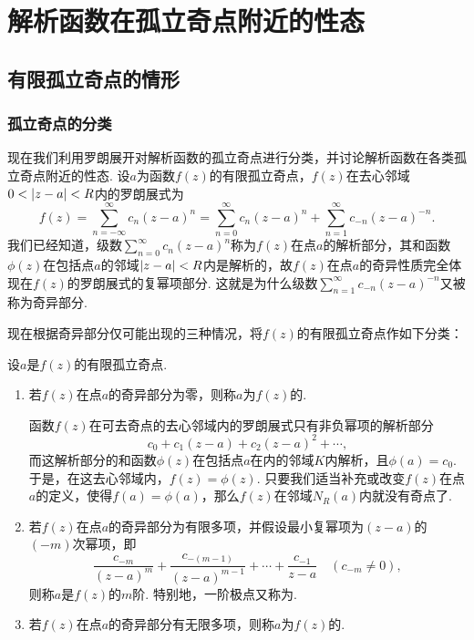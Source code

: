 \section{解析函数在孤立奇点附近的性态}
\subsection{有限孤立奇点的情形}
\subsubsection{孤立奇点的分类}
现在我们利用罗朗展开对解析函数的孤立奇点进行分类，并讨论解析函数在各类孤立奇点附近的性态.
设\(a\)为函数\(f(z)\)的有限孤立奇点，\(f(z)\)在去心邻域\(0<\abs{z-a}<R\)内的罗朗展式为\[
f(z) = \sum\limits_{n=-\infty}^\infty c_n (z-a)^n
= \sum\limits_{n=0}^\infty c_n (z-a)^n
+ \sum\limits_{n=1}^\infty c_{-n} (z-a)^{-n}.
\]我们已经知道，级数\(\sum\limits_{n=0}^\infty c_n (z-a)^n\)称为\(f(z)\)在点\(a\)的解析部分，其和函数\(\phi(z)\)在包括点\(a\)的邻域\(\abs{z-a}<R\)内是解析的，故\(f(z)\)在点\(a\)的奇异性质完全体现在\(f(z)\)的罗朗展式的复幂项部分.
这就是为什么级数\(\sum\limits_{n=1}^\infty c_{-n} (z-a)^{-n}\)又被称为奇异部分.

现在根据奇异部分仅可能出现的三种情况，将\(f(z)\)的有限孤立奇点作如下分类：
\begin{definition}
设\(a\)是\(f(z)\)的有限孤立奇点.
\begin{enumerate}
\item 若\(f(z)\)在点\(a\)的奇异部分为零，则称\(a\)为\(f(z)\)的.

{\footnotesize
函数\(f(z)\)在可去奇点的去心邻域内的罗朗展式只有非负幂项的解析部分\[
c_0 + c_1 (z-a) + c_2 (z-a)^2 + \dotsb,
\]而这解析部分的和函数\(\phi(z)\)在包括点\(a\)在内的邻域\(K\)内解析，且\(\phi(a) = c_0\).
于是，在这去心邻域内，\(f(z) = \phi(z)\).
只要我们适当补充或改变\(f(z)\)在点\(a\)的定义，使得\(f(a) = \phi(a)\)，那么\(f(z)\)在邻域\(N_R(a)\)内就没有奇点了.
}

\item 若\(f(z)\)在点\(a\)的奇异部分为有限多项，并假设最小复幂项为\((z-a)\)的\((-m)\)次幂项，即\[
\frac{c_{-m}}{(z-a)^m} + \frac{c_{-(m-1)}}{(z-a)^{m-1}} + \dotsb + \frac{c_{-1}}{z-a}
\quad(c_{-m}\neq0),
\]则称\(a\)是\(f(z)\)的\(m\)阶.
特别地，一阶极点又称为.

\item 若\(f(z)\)在点\(a\)的奇异部分有无限多项，则称\(a\)为\(f(z)\)的.
\end{enumerate}
\end{definition}


